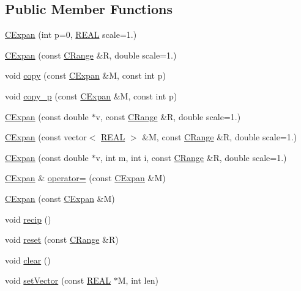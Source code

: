 \subsection*{Public Member Functions}
\begin{DoxyCompactItemize}
\item 
\hyperlink{classCExpan_abc75d2ba91c4eedfa5661ab40dc768e8}{C\-Expan} (int p=0, \hyperlink{util_8h_a5821460e95a0800cf9f24c38915cbbde}{R\-E\-A\-L} scale=1.)
\item 
\hyperlink{classCExpan_a7b7603483a63741e1fa4a0f8dfee9588}{C\-Expan} (const \hyperlink{classCRange}{C\-Range} \&R, double scale=1.)
\item 
void \hyperlink{classCExpan_aa72484521209a587e90bc46ed204a59a}{copy} (const \hyperlink{classCExpan}{C\-Expan} \&M, const int p)
\item 
void \hyperlink{classCExpan_acc9b0757c5c8ce7f30a3b2dca9559128}{copy\-\_\-p} (const \hyperlink{classCExpan}{C\-Expan} \&M, const int p)
\item 
\hyperlink{classCExpan_adc9fc140dbe8c422c568d0c9db0114e2}{C\-Expan} (const double $\ast$v, const \hyperlink{classCRange}{C\-Range} \&R, double scale=1.)
\item 
\hyperlink{classCExpan_a723a9f25b0c284fea509e7a5bdd76ce0}{C\-Expan} (const vector$<$ \hyperlink{util_8h_a5821460e95a0800cf9f24c38915cbbde}{R\-E\-A\-L} $>$ \&M, const \hyperlink{classCRange}{C\-Range} \&R, double scale=1.)
\item 
\hyperlink{classCExpan_a896dcdd00c40227c6b2299c7859dcb24}{C\-Expan} (const double $\ast$v, int m, int i, const \hyperlink{classCRange}{C\-Range} \&R, double scale=1.)
\item 
\hyperlink{classCExpan}{C\-Expan} \& \hyperlink{classCExpan_a2d3ed1e4ae47409a06009cba50d74024}{operator=} (const \hyperlink{classCExpan}{C\-Expan} \&M)
\item 
\hyperlink{classCExpan_a6ac0c2ff3c5692067ce40c16e4c564e2}{C\-Expan} (const \hyperlink{classCExpan}{C\-Expan} \&M)
\item 
void \hyperlink{classCExpan_a5c603986cd9b905dafefd83370a89d8c}{recip} ()
\item 
void \hyperlink{classCExpan_a8a6140fec725f418de3895bbf954e830}{reset} (const \hyperlink{classCRange}{C\-Range} \&R)
\item 
void \hyperlink{classCExpan_a0804b9108e1b448fe6fd101b338f1814}{clear} ()
\item 
void \hyperlink{classCExpan_ab384e5b3d427707106d655d8d9585ecc}{set\-Vector} (const \hyperlink{util_8h_a5821460e95a0800cf9f24c38915cbbde}{R\-E\-A\-L} $\ast$M, int len)

\end{DoxyCompactItemize}
